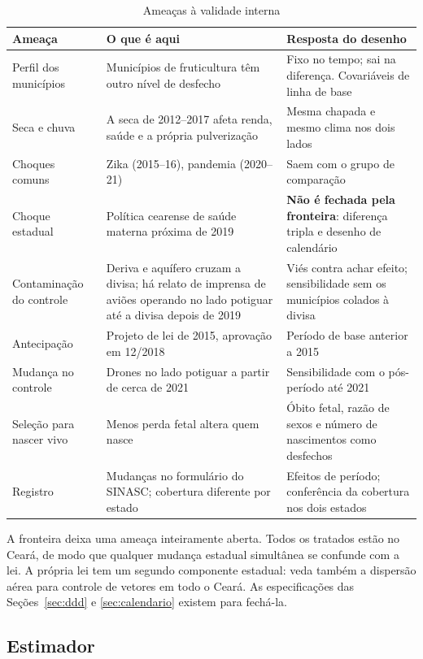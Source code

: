\begin{table}[ht]
\centering\small
\caption{Ameaças à validade interna}
\label{tab:ameacas}
\begin{tabularx}{\textwidth}{@{}p{3.1cm}LL@{}}
\toprule
Ameaça & O que é aqui & Resposta do desenho \\
\midrule
Perfil dos municípios & Municípios de fruticultura têm outro nível de desfecho & Fixo no tempo; sai na diferença. Covariáveis de linha de base \\
Seca e chuva & A seca de 2012--2017 afeta renda, saúde e a própria pulverização & Mesma chapada e mesmo clima nos dois lados \\
Choques comuns & Zika (2015--16), pandemia (2020--21) & Saem com o grupo de comparação \\
Choque estadual & Política cearense de saúde materna próxima de 2019 & \textbf{Não é fechada pela fronteira}: diferença tripla e desenho de calendário \\
Contaminação do controle & Deriva e aquífero cruzam a divisa; há relato de imprensa de aviões operando no lado potiguar até a divisa depois de 2019 & Viés contra achar efeito; sensibilidade sem os municípios colados à divisa \\
Antecipação & Projeto de lei de 2015, aprovação em 12/2018 & Período de base anterior a 2015 \\
Mudança no controle & Drones no lado potiguar a partir de cerca de 2021 & Sensibilidade com o pós-período até 2021 \\
Seleção para nascer vivo & Menos perda fetal altera quem nasce & Óbito fetal, razão de sexos e número de nascimentos como desfechos \\
Registro & Mudanças no formulário do SINASC; cobertura diferente por estado & Efeitos de período; conferência da cobertura nos dois estados \\
\bottomrule
\end{tabularx}
\end{table}

A fronteira deixa uma ameaça inteiramente aberta. Todos os tratados estão
no Ceará, de modo que qualquer mudança estadual simultânea se confunde com a
lei. A própria lei tem um segundo componente estadual: veda também a dispersão
aérea para controle de vetores em todo o Ceará. As especificações das Seções~\ref{sec:ddd} e \ref{sec:calendario} existem
para fechá-la.

\subsection{Estimador}

